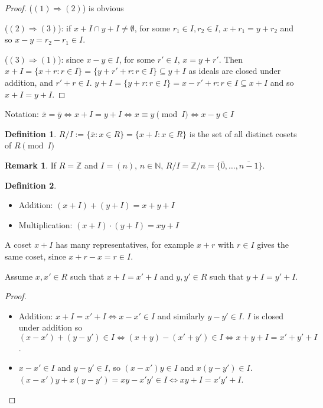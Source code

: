 \documentclass[12pt,a4paper]{article}
\theoremstyle{definition}
\newtheorem{definition}{Definition}[subsection]
\newtheorem*{remark}{Remark}
\begin{document}
\begin{proof}
	($(1) \Rightarrow (2)$) is obvious

	($(2) \Rightarrow (3)$): if $x + I \cap y + I \ne \emptyset$, for some $r_1 \in I, r_2 \in I$, $x + r_1 = y + r_2$ and so $x - y = r_2 - r_1 \in I$.

	($(3) \Rightarrow (1)$): since $x - y \in I$, for some $r' \in I$, $x = y + r'$. Then $x + I = \{x + r: r \in I\} = \{y + r' + r: r \in I\} \subseteq y + I$ as ideals are closed under addition, and $r' + r \in I$. $y + I = \{y + r: r \in I\} = {x - r' + r: r \in I} \subseteq x + I$ and so $x + I = y + I$.
\end{proof}

Notation: $\bar{x} = \bar{y} \Leftrightarrow x + I = y + I \Leftrightarrow x \equiv y \pmod I \Leftrightarrow x - y \in I$

\begin{definition}
	$R / I := \{\bar{x}: x \in R \} = \{x + I: x \in R\}$ is the set of all distinct cosets of $R \pmod I$ 
\end{definition}

\begin{remark}
	If $R = \mathbb{Z}$ and $I = (n)$, $n \in \mathbb{N}$, $R / I = \mathbb{Z} / n = \{\bar{0}, \dots, \bar{n - 1}\}$.
\end{remark}

\begin{definition}
	\hfill\break
	\begin{itemize}
		\item Addition: $(x + I) + (y + I) = x + y + I$
		\item Multiplication: $(x + I) \cdot (y + I) = xy + I$
	\end{itemize}
\end{definition}

A coset $x + I$ has many representatives, for example $x + r$ with $r \in I$ gives the same coset, since $x + r - x = r \in I$.

Assume $x, x' \in R$ such that $x + I = x' + I$ and $y, y' \in R$ such that $y + I = y' + I$.

\begin{proof}
	\begin{itemize}
		\item Addition: $x + I = x' + I \Leftrightarrow x - x' \in I$ and similarly $y - y' \in I$. $I$ is closed under addition so $(x - x') + (y - y') \in I \Leftrightarrow (x + y) - (x' + y') \in I \Leftrightarrow x + y + I = x' + y' + I$.
		\item $x - x' \in I$ and $y - y' \in I$, so $(x - x')y \in I$ and $x(y - y') \in I$. $(x - x')y + x(y - y') = xy - x'y' \in I \Leftrightarrow xy + I = x'y' + I$.
	\end{itemize}
\end{proof}
\end{document}
